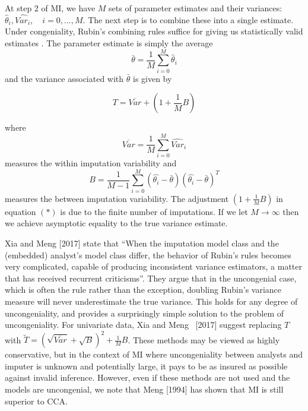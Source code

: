 \documentclass{article}
\begin{document}
	At step 2 of MI, we have $M$ sets of parameter estimates and their variances: $\hat{\theta}_{i},\hat{Var_{i}}, \quad i=0,...,M$. The next step is to combine these into a single estimate. Under congeniality, Rubin's combining rules suffice for giving us statistically valid estimates \cite{Meng1994}. The parameter estimate is simply the average $$\bar{\theta} = \frac{1}{M}\sum_{i=0}^{M}\hat{\theta}_{i}$$ and the variance associated with $\bar{\theta}$ is given by 
	 
	\begin{equation}
		T = \overline{Var}+(1+\frac{1}{M}B)\tag{*}
	\end{equation}
	
	where $$\overline{Var} = \frac{1}{M}\sum_{i=0}^{M}\hat{Var}_{i}$$ measures the within imputation variability and $$B = \frac{1}{M-1}\sum_{i=0}^{M}(\hat{\theta_{i}}-\bar{\theta})(\hat{\theta_{i}}-\bar{\theta})^{T}$$ measures the between imputation variability. The adjustment $(1+\frac{1}{M}B)$ in equation $(*)$ is due to the finite number of imputations. If we let $M\rightarrow\infty$ then we achieve asymptotic equality to the true variance estimate.
	
	Xia and Meng [2017] state that \enquote{When the imputation model class and the (embedded) analyst’s model class
		differ, the behavior of Rubin’s rules becomes very complicated, capable of producing inconsistent variance estimators, a matter that has received recurrent
		criticisms}. They argue that in the uncongenial case, which is often the rule rather than the exception, doubling Rubin's variance measure will never underestimate the true variance. This holds for any degree of uncongeniality, and provides a surprisingly simple solution to the problem of uncongeniality. For univariate data, Xia and Meng  [2017] suggest replacing $T$ with $\tilde{T}= (\sqrt{\overline{Var}}+\sqrt{B})^{2}+\frac{1}{M}B$. These methods may be viewed as highly conservative, but in the context of MI where uncongeniality between analysts and imputer is unknown and potentially large, it pays to be as insured as possible against invalid inference. However, even if these methods are not used and the models are uncongenial, we note that Meng [1994] has shown that MI is still superior to CCA.
	
\end{document}
